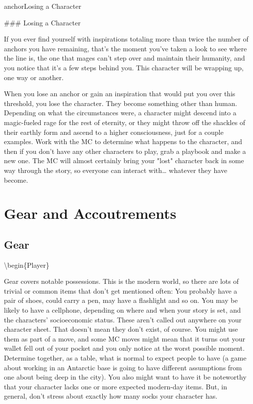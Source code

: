\documentclass[
  oneside,
  statementpaper,
  9pt]{memoir}
\begin{document}
\begin{Player}
{{anchorLosing a Character}}

### Losing a Character

If you ever find yourself with inspirations totaling more than twice the number of anchors you have remaining, that’s the moment you’ve taken a look to see where the line is, the one that mages can’t step over and maintain their humanity, and you notice that it’s a few steps behind you. This character will be wrapping up, one way or another. 

When you lose an anchor or gain an inspiration that would put you over this threshold, you lose the character. They become something other than human. Depending on what the circumstances were, a character might descend into a magic-fueled rage for the rest of eternity, or they might throw off the shackles of their earthly form and ascend to a higher consciousness, just for a couple examples. Work with the MC to determine what happens to the character, and then if you don’t have any other characters to play, grab a playbook and make a new one. The MC will almost certainly bring your "lost" character back in some way through the story, so everyone can interact with… whatever they have become.

\end{Player}

\newpage

\label{Gear and Accoutrements chapter}

\hypertarget{gear-and-accoutrements-1}{%
\chapter{Gear and Accoutrements}\label{gear-and-accoutrements-1}}

\hypertarget{gear}{%
\section{Gear}\label{gear}}

\textbackslash begin\{Player\}

Gear covers notable possessions. This is the modern world, so there are
lots of trivial or common items that don't get mentioned often: You
probably have a pair of shoes, could carry a pen, may have a flashlight
and so on. You may be likely to have a cellphone, depending on where and
when your story is set, and the characters' socioeconomic status. These
aren't called out anywhere on your character sheet. That doesn't mean
they don't exist, of course. You might use them as part of a move, and
some MC moves might mean that it turns out your wallet fell out of your
pocket and you only notice at the worst possible moment. Determine
together, as a table, what is normal to expect people to have (a game
about working in an Antarctic base is going to have different
assumptions from one about being deep in the city). You also might want
to have it be noteworthy that your character lacks one or more expected
modern-day items. But, in general, don't stress about exactly how many
socks your character has.
\end{document}
